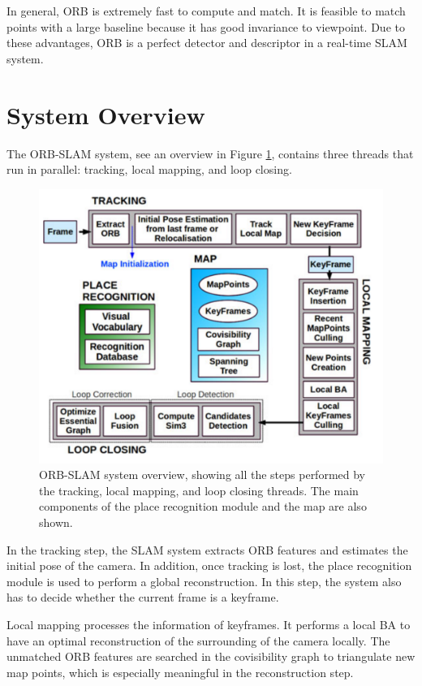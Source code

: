 \documentclass[letterpaper, 10 pt, conference]{ieeeconf}  %
\begin{document}
In general, ORB is extremely fast to compute and match. It is feasible to match points with a large baseline because it has good invariance to viewpoint. Due to these advantages, ORB is a perfect detector and descriptor in a real-time SLAM system. 


\section{System Overview}
\label{section3}
The ORB-SLAM system, see an overview in Figure \ref{system_overview}, contains three threads that run in parallel: tracking, local mapping, and loop closing.

\begin{figure}[!htbp]%
\centering
\includegraphics[scale=0.22]{./images/System_overview}
\caption{ORB-SLAM system overview, showing all the steps performed by the
tracking, local mapping, and loop closing threads. The main components of the
place recognition module and the map are also shown.}
\label{system_overview}
\end{figure}

In the tracking step, the SLAM system extracts ORB features and estimates the initial pose of the camera. In addition, once tracking is lost,  the place recognition module is used to perform a global reconstruction. In this step, the system also has to decide whether the current frame is a keyframe. 

Local mapping processes the information of keyframes. It performs a local BA to have an optimal reconstruction of the surrounding of the camera locally. The unmatched ORB features are searched in the covisibility graph to triangulate new map points, which is especially meaningful in the reconstruction step.
\end{document}
